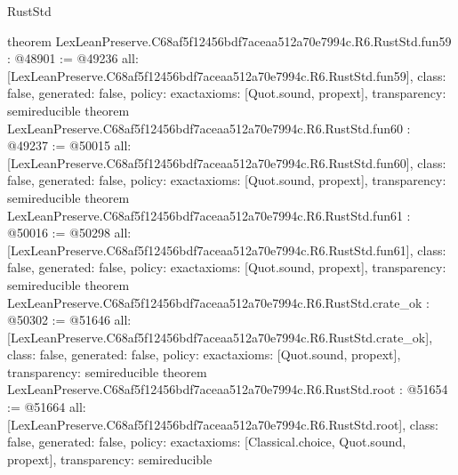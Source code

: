 \begin{lexlean}{RustStd}
\begin{coremodule}
{}
theorem LexLeanPreserve.C68af5f12456bdf7aceaa512a70e7994c.R6.RustStd.fun59 : @48901 := @49236 {
  all: [LexLeanPreserve.C68af5f12456bdf7aceaa512a70e7994c.R6.RustStd.fun59],
  class: false,
  generated: false,
  policy: exact{axioms: [Quot.sound, propext]},
  transparency: semireducible
}
theorem LexLeanPreserve.C68af5f12456bdf7aceaa512a70e7994c.R6.RustStd.fun60 : @49237 := @50015 {
  all: [LexLeanPreserve.C68af5f12456bdf7aceaa512a70e7994c.R6.RustStd.fun60],
  class: false,
  generated: false,
  policy: exact{axioms: [Quot.sound, propext]},
  transparency: semireducible
}
theorem LexLeanPreserve.C68af5f12456bdf7aceaa512a70e7994c.R6.RustStd.fun61 : @50016 := @50298 {
  all: [LexLeanPreserve.C68af5f12456bdf7aceaa512a70e7994c.R6.RustStd.fun61],
  class: false,
  generated: false,
  policy: exact{axioms: [Quot.sound, propext]},
  transparency: semireducible
}
theorem LexLeanPreserve.C68af5f12456bdf7aceaa512a70e7994c.R6.RustStd.crate_ok : @50302 := @51646 {
  all: [LexLeanPreserve.C68af5f12456bdf7aceaa512a70e7994c.R6.RustStd.crate_ok],
  class: false,
  generated: false,
  policy: exact{axioms: [Quot.sound, propext]},
  transparency: semireducible
}
theorem LexLeanPreserve.C68af5f12456bdf7aceaa512a70e7994c.R6.RustStd.root : @51654 := @51664 {
  all: [LexLeanPreserve.C68af5f12456bdf7aceaa512a70e7994c.R6.RustStd.root],
  class: false,
  generated: false,
  policy: exact{axioms: [Classical.choice, Quot.sound, propext]},
  transparency: semireducible
}


\end{coremodule}
\end{lexlean}
